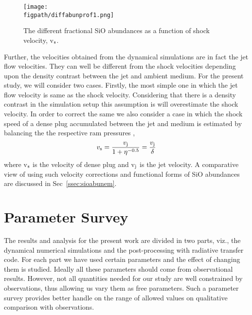 \documentclass[useAMS,usenatbib,letters]{mn2e}
\newcommand{\figpath}{PFIGS/}
\begin{document}
\begin{figure}
 \texttt{[image: \\figpath/diffabunprof1.png]}
 \caption{The different fractional SiO abundances as a function of
   shock velocity, v$_{\rm s}$.}
 \label{abun}
\end{figure}

Further, the velocities obtained from the dynamical simulations are in fact the
jet flow velocities. They can well be different from the shock
velocities depending upon the density contrast between the jet and
ambient medium. For the present study, we will consider two
cases. Firstly, the most simple one in which the jet flow velocity is
same as the shock velocity. Considering that there is a density
contrast in the simulation setup this assumption is will
overestimate the shock velocity. In order to correct the same we also
consider a case in which the shock speed of a dense plug accumulated
between the jet and medium is estimated by balancing the the respective ram
pressures \citep{Masson:1993p9661},
\begin{equation}
\label{eq:shockjetvel}
v_{\rm s} = \frac{v_{\rm j}}{1 + \eta^{-0.5}} = \frac{v_{\rm j}}{\delta}
\end{equation}
where v$_{\rm s}$ is the velocity of dense plug and v$_{\rm j}$ is the
jet velocity. A comparative view of using such velocity corrections and
functional forms of SiO abundances are discussed in
Sec~\ref{ssec:sioabunem}.

    







\section{Parameter Survey}
The results and analysis for the present work are divided in two parts,
viz., the dynamical numerical simulations and the post-processing with
radiative transfer code. For each part we have used certain parameters
and the effect of changing them is studied. Ideally all these parameters should come from observational
results. However, not all quantities needed for our study are well
constrained by observations, thus allowing us vary them as
free parameters. Such a parameter survey provides better handle on the range of allowed
values on qualitative comparison with observations. 
%
\end{document}
